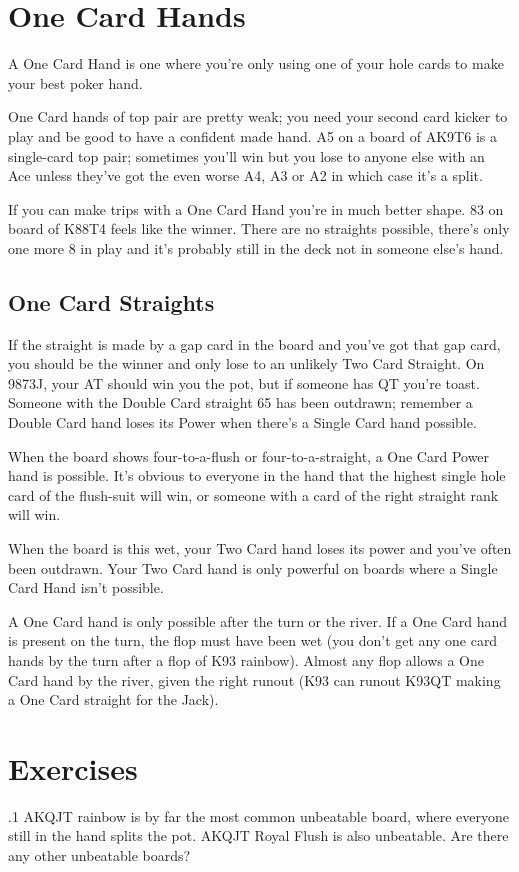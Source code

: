 \section{One Card Hands}

A One Card Hand is one where you're only using one of your hole
cards to make your best poker hand.

One Card hands of top pair are pretty weak; you need your second card
kicker to play and be good to have a confident made hand. A5 on a
board of AK9T6 is a single-card top pair; sometimes you'll win but you
lose to anyone else with an Ace unless they've got the even worse A4,
A3 or A2 in which case it's a split.

If you can make trips with a One Card Hand you're in much better
shape. 83 on board of K88T4 feels like the winner. There are no
straights possible, there's only one more 8 in play and
it's probably still in the deck not in someone else's hand.

\subsection{One Card Straights}

If the straight is made by a gap card in the board and you've got that
gap card, you should be the winner and only lose to an unlikely Two
Card Straight. On 9873J, your AT should win you the pot, but if
someone has QT you're toast. Someone with the Double Card straight 65
has been outdrawn; remember a Double Card hand loses its Power when
there's a Single Card hand possible.

When the board shows four-to-a-flush or four-to-a-straight, a One
Card Power hand is possible. It's obvious to everyone in the hand that
the highest single hole card of the flush-suit will win, or someone
with a card of the right straight rank will win.

When the board is this wet, your Two Card hand loses its power and
you've often been outdrawn. Your Two Card hand is only powerful on
boards where a Single Card Hand isn't possible.

A One Card hand is only possible after the turn or the river. If a
One Card hand is present on the turn, the flop must have been wet
(you don't get any one card hands by the turn after a flop of K93
rainbow). Almost any flop allows a One Card hand by the river,
given the right runout (K93 can runout K93QT making a One Card
straight for the Jack).

\section{Exercises}

.1 AKQJT rainbow is by far the most common unbeatable
board, where everyone still in the hand splits the pot. AKQJT Royal
Flush is also unbeatable. Are there any other unbeatable boards?
